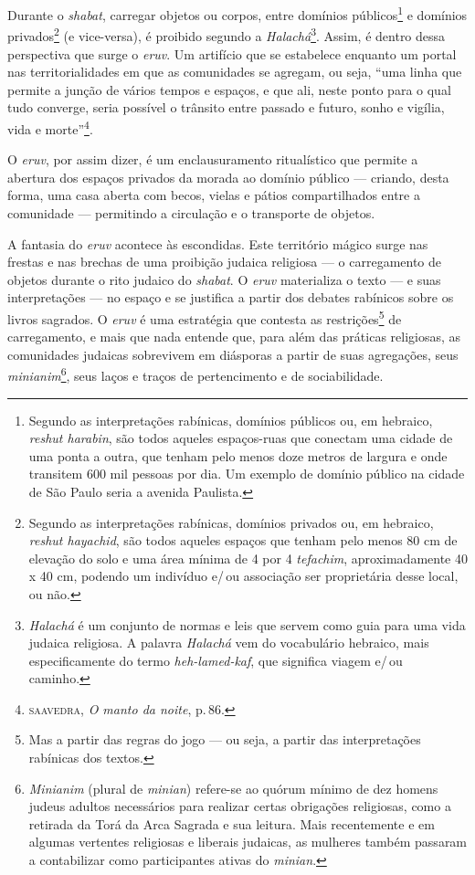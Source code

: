 Durante o \emph{shabat}, carregar objetos ou corpos, entre domínios
públicos\footnote{Segundo as interpretações rabínicas, domínios públicos
  ou, em hebraico, \emph{reshut harabin}, são todos aqueles espaços-ruas
  que conectam uma cidade de uma ponta a outra, que tenham pelo menos
  doze metros de largura e onde transitem 600 mil pessoas por dia. Um
  exemplo de domínio público na cidade de São Paulo seria a avenida
  Paulista.} e domínios privados\footnote{Segundo as interpretações
  rabínicas, domínios privados ou, em hebraico, \emph{reshut hayachid},
  são todos aqueles espaços que tenham pelo menos 80 cm de elevação do
  solo e uma área mínima de 4 por 4 \emph{tefachim}, aproximadamente 40
  x 40 cm, podendo um indivíduo e/\,ou associação ser proprietária desse
  local, ou não.} (e vice-versa), é proibido segundo a
\emph{Halachá}\footnote{\emph{Halachá} é um conjunto de normas e leis
  que servem como guia para uma vida judaica religiosa. A palavra
  \emph{Halachá} vem do vocabulário hebraico, mais especificamente do
  termo \emph{heh-lamed-kaf}, que significa viagem e/\,ou caminho.}.
Assim, é dentro dessa perspectiva que surge o \emph{eruv}. Um artifício
que se estabelece enquanto um portal nas territorialidades em que as
comunidades se agregam, ou seja, ``uma linha que permite a junção
de vários tempos e espaços, e que ali, neste ponto para o qual tudo
converge, seria possível o trânsito entre passado e futuro, sonho e
vigília, vida e morte''\footnote{\textsc{saavedra}, \emph{O manto da noite}, p.\,86.}.

O \emph{eruv}, por assim dizer, é um enclausuramento ritualístico que
permite a abertura dos espaços privados da morada ao domínio público ---
criando, desta forma, uma casa aberta com becos, vielas e pátios
compartilhados entre a comunidade --- permitindo a circulação e o
transporte de objetos.

A fantasia do \emph{eruv} acontece às escondidas. Este território mágico
surge nas frestas e nas brechas de uma proibição judaica religiosa --- o
carregamento de objetos durante o rito judaico do \emph{shabat}. O
\emph{eruv} materializa o texto --- e suas interpretações --- no espaço
e se justifica a partir dos debates rabínicos sobre os livros sagrados.
O \emph{eruv} é uma estratégia que contesta as restrições\footnote{Mas a
  partir das regras do jogo --- ou seja, a partir das interpretações
  rabínicas dos textos.} de carregamento, e mais que nada entende que,
para além das práticas religiosas, as comunidades judaicas sobrevivem em
diásporas a partir de suas agregações, seus \emph{minianim}\footnote{\emph{Minianim}
  (plural de \emph{minian}) refere-se ao quórum mínimo de dez homens
  judeus adultos necessários para realizar certas obrigações religiosas,
  como a retirada da Torá da Arca Sagrada e sua leitura. Mais
  recentemente e em algumas vertentes religiosas e liberais judaicas, as
  mulheres também passaram a contabilizar como participantes ativas do
  \emph{minian}.}, seus laços e traços de pertencimento e de
sociabilidade.

